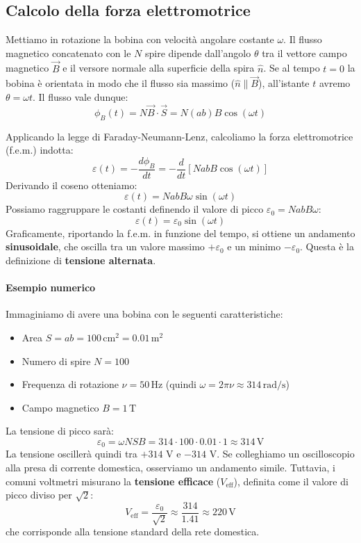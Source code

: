 \documentclass{book}
\begin{document}
\subsection{Calcolo della forza elettromotrice}
Mettiamo in rotazione la bobina con velocità angolare costante $\omega$.
Il flusso magnetico concatenato con le $N$ spire dipende dall'angolo $\theta$ tra il vettore campo magnetico $\vec{B}$ e il versore normale alla superficie della spira $\hat{n}$.
Se al tempo $t=0$ la bobina è orientata in modo che il flusso sia massimo ($\hat{n} \parallel \vec{B}$), all'istante $t$ avremo $\theta = \omega t$.
Il flusso vale dunque:
$$
\phi_B(t) = N \vec{B} \cdot \vec{S} = N (ab) B \cos(\omega t)
$$

Applicando la legge di Faraday-Neumann-Lenz, calcoliamo la forza elettromotrice (f.e.m.) indotta:
$$
\varepsilon(t)= - \frac{d \phi_B}{dt} = - \frac{d}{dt} [N ab B \cos(\omega t)]
$$
Derivando il coseno otteniamo:
$$
\varepsilon(t) = N ab B \omega \sin(\omega t)
$$
Possiamo raggruppare le costanti definendo il valore di picco $\varepsilon_0 = N ab B \omega$:
$$
\varepsilon(t) = \varepsilon_0 \sin(\omega t)
$$
Graficamente, riportando la f.e.m. in funzione del tempo, si ottiene un andamento \textbf{sinusoidale}, che oscilla tra un valore massimo $+\varepsilon_0$ e un minimo $-\varepsilon_0$. Questa è la definizione di \textbf{tensione alternata}.

\paragraph{Esempio numerico}
Immaginiamo di avere una bobina con le seguenti caratteristiche:
\begin{itemize}
    \item Area $S = ab = 100\, \text{cm}^2 = 0.01\, \text{m}^2$
    \item Numero di spire $N = 100$
    \item Frequenza di rotazione $\nu = 50\, \text{Hz}$ (quindi $\omega = 2\pi\nu \approx 314\, \text{rad/s}$)
    \item Campo magnetico $B = 1\, \text{T}$
\end{itemize}
La tensione di picco sarà:
$$
\varepsilon_0 = \omega N S B = 314 \cdot 100 \cdot 0.01 \cdot 1 \approx 314\, \text{V}
$$
La tensione oscillerà quindi tra $+314$ V e $-314$ V.
Se colleghiamo un oscilloscopio alla presa di corrente domestica, osserviamo un andamento simile. Tuttavia, i comuni voltmetri misurano la \textbf{tensione efficace} ($V_{\text{eff}}$), definita come il valore di picco diviso per $\sqrt{2}$:
$$ V_{\text{eff}} = \frac{\varepsilon_0}{\sqrt{2}} \approx \frac{314}{1.41} \approx 220\, \text{V} $$
che corrisponde alla tensione standard della rete domestica.
\end{document}

